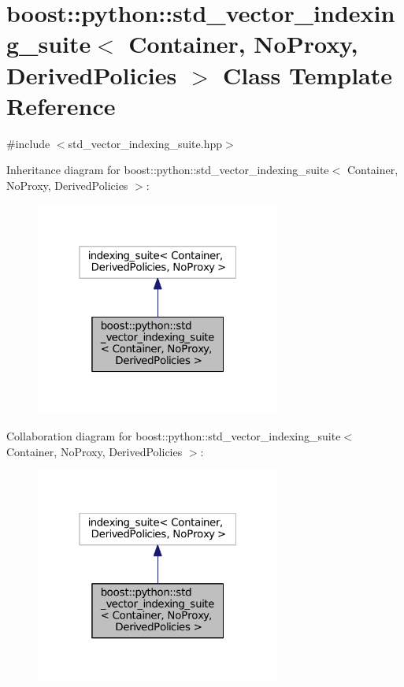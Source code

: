 \hypertarget{classboost_1_1python_1_1std__vector__indexing__suite}{}\section{boost\+:\+:python\+:\+:std\+\_\+vector\+\_\+indexing\+\_\+suite$<$ Container, No\+Proxy, Derived\+Policies $>$ Class Template Reference}
\label{classboost_1_1python_1_1std__vector__indexing__suite}


{\ttfamily \#include $<$std\+\_\+vector\+\_\+indexing\+\_\+suite.\+hpp$>$}



Inheritance diagram for boost\+:\+:python\+:\+:std\+\_\+vector\+\_\+indexing\+\_\+suite$<$ Container, No\+Proxy, Derived\+Policies $>$\+:\nopagebreak
\begin{figure}[H]
\begin{center}
\leavevmode
\includegraphics[width=229pt]{classboost_1_1python_1_1std__vector__indexing__suite__inherit__graph}
\end{center}
\end{figure}


Collaboration diagram for boost\+:\+:python\+:\+:std\+\_\+vector\+\_\+indexing\+\_\+suite$<$ Container, No\+Proxy, Derived\+Policies $>$\+:\nopagebreak
\begin{figure}[H]
\begin{center}
\leavevmode
\includegraphics[width=229pt]{classboost_1_1python_1_1std__vector__indexing__suite__coll__graph}
\end{center}
\end{figure}
